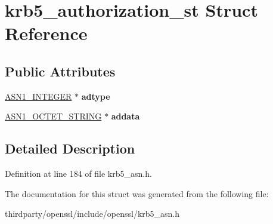 \hypertarget{structkrb5__authorization__st}{}\section{krb5\+\_\+authorization\+\_\+st Struct Reference}
\label{structkrb5__authorization__st}
\subsection*{Public Attributes}
\begin{DoxyCompactItemize}
\item 
\mbox{\label{structkrb5__authorization__st_a3e75f4cc0ea59482895df0c540561f82}} 
\hyperlink{structasn1__string__st}{A\+S\+N1\+\_\+\+I\+N\+T\+E\+G\+ER} $\ast$ {\bfseries adtype}
\item 
\mbox{\label{structkrb5__authorization__st_a26158edad70a1f032c0203033439a5cf}} 
\hyperlink{structasn1__string__st}{A\+S\+N1\+\_\+\+O\+C\+T\+E\+T\+\_\+\+S\+T\+R\+I\+NG} $\ast$ {\bfseries addata}
\end{DoxyCompactItemize}


\subsection{Detailed Description}


Definition at line 184 of file krb5\+\_\+asn.\+h.



The documentation for this struct was generated from the following file\+:\begin{DoxyCompactItemize}
\item 
thirdparty/openssl/include/openssl/krb5\+\_\+asn.\+h\end{DoxyCompactItemize}
